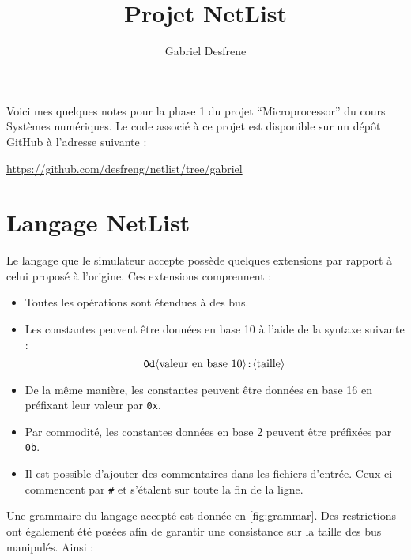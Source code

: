 \documentclass[french, 12pt]{article}
\title{Projet NetList}
\author{Gabriel Desfrene}
\date{}
\begin{document}
\maketitle

Voici mes quelques notes pour la phase 1 du projet ``Microprocessor'' du cours Systèmes numériques.
Le code associé à ce projet est disponible sur un dépôt GitHub à l'adresse suivante :
\begin{center}
      \url{https://github.com/desfreng/netlist/tree/gabriel}
\end{center}

\section {Langage NetList}\label{sec:langage-netlist}
Le langage que le simulateur accepte possède quelques extensions par rapport à celui proposé à l'origine.
Ces extensions comprennent :

\begin{itemize}
      \item Toutes les opérations sont étendues à des bus.
      \item Les constantes peuvent être données en base 10 à l'aide de la syntaxe
            suivante :
            \[\verb|0d|\langle\text{valeur en base 10}\rangle\verb|:|\langle\text{taille}\rangle\]
      \item De la même manière, les constantes peuvent être données en base 16 en
            préfixant leur valeur par \verb|0x|.
      \item Par commodité, les constantes données en base 2 peuvent être préfixées
            par \verb|0b|.
      \item Il est possible d'ajouter des commentaires dans les fichiers d'entrée.
            Ceux-ci commencent par \verb|#| et s'étalent sur toute la fin de la ligne.
\end{itemize}


Une grammaire du langage accepté est donnée en \autoref{fig:grammar}.
Des restrictions ont également été posées afin de garantir une consistance sur la taille des bus manipulés.
Ainsi :
\end{document}
